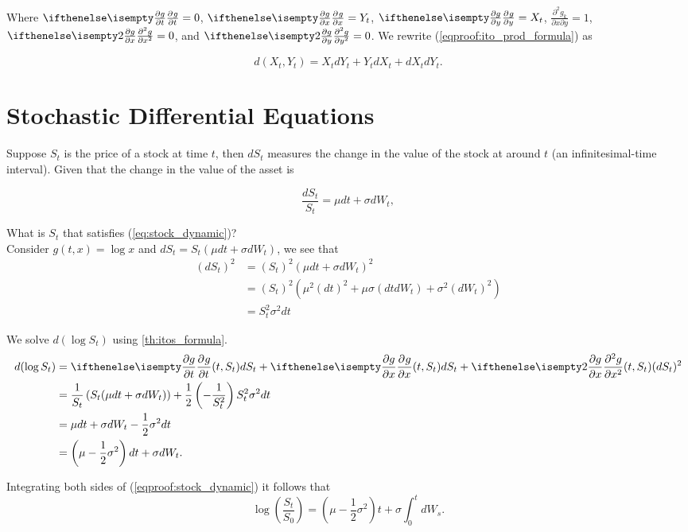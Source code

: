 \documentclass[../TGMAFFIRO.tex]{subfiles}
\begin{document}
Where $\partialwrt{g}{t} = 0$, $\partialwrt{g}{x} = Y_t$, $\partialwrt{g}{y} = X_t$, $\frac{\partial^2g_k}{\partial x\partial y} = 1$, $\partialwrt[2]{g}{x} = 0$, and $\partialwrt[2]{g}{y} = 0$. We rewrite (\ref{eqproof:ito_prod_formula}) as

\begin{equation}
  d(X_t, Y_t) = X_t dY_t + Y_t dX_t + dX_t dY_t. \label{eq:ito_rule_product}
\end{equation}

\section{Stochastic Differential Equations}
Suppose $S_t$ is the price of a stock at time $t$, then $dS_t$ measures the change in the value of the stock at around $t$ (an infinitesimal-time interval). Given that the change in the value of the asset is

\begin{equation}
	\frac{dS_t}{S_t} = \mu dt + \sigma dW_t, \label{eq:stock_dynamic}
\end{equation}

What is $S_t$ that satisfies (\ref{eq:stock_dynamic})?\\

Consider $g(t, x)= \log x$ and $dS_t = S_t(\mu dt + \sigma dW_t)$, we see that
\begin{align}
	\left(dS_t\right)^2 &= (S_t)^2(\mu dt + \sigma dW_t)^2\nonumber\\
		&= (S_t)^2(\mu^2 \left(dt\right)^2 + \mu\sigma (dtdW_t) + \sigma^2 (dW_t)^2)\nonumber\\
		&= S_t^2\sigma^2 dt
\end{align}

We solve $d(\log S_t)$ using \ref{th:itos_formula}.
\begin{align}
	d(\log S_t) &= \partialwrt{g}{t}{(t, S_t)} dS_t + \partialwrt{g}{x}{(t, S_t)} dS_t + \partialwrt[2]{g}{x}{(t, S_t)} (dS_t)^2 \nonumber \\
&= \frac{1}{S_t}\left(S_t(\mu dt + \sigma dW_t)\right) + \frac{1}{2}\left(-\frac{1}{S_t^2} \right)S_t^2\sigma^2 dt \nonumber \\
&= \mu dt + \sigma dW_t - \frac{1}{2}\sigma^2 dt \nonumber \\
&= \left(\mu - \frac{1}{2}\sigma^2\right)dt + \sigma dW_t. \label{eqproof:stock_dynamic}
\end{align}

Integrating both sides of (\ref{eqproof:stock_dynamic}) it follows that
\begin{equation}
	\log\left(\frac{S_t}{S_0}\right) = \left(\mu - \frac{1}{2}\sigma^2\right) t + \sigma\int_0^t dW_s.
\end{equation}
\end{document}
